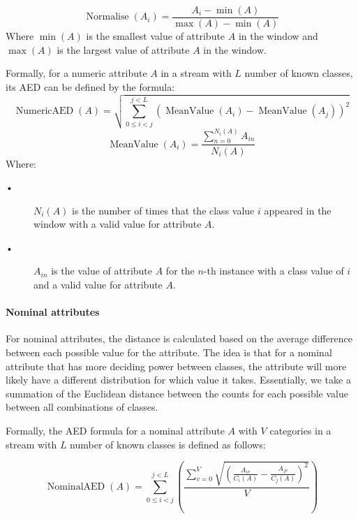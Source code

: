 \begin{equation}
\operatorname{Normalise}(A_i) = 
\frac{A_i - \operatorname{min}(A)}
     {\operatorname{max}(A) - \operatorname{min}(A)}
\end{equation}
Where $\operatorname{min}(A)$ is the smallest value of attribute $A$ in the window and $\operatorname{max}(A)$ is the largest value of attribute $A$ in the window.\bigskip

Formally, for a numeric attribute $A$ in a stream with $L$ number of known classes, its AED can be defined by the formula:\medskip
\begin{equation}
\operatorname{Numeric AED}(A) = 
\sqrt{
	\sum_{0\leq i<j}^{j<L}
	\left(
		\operatorname{MeanValue}(A_i)
		-
		\operatorname{MeanValue}(A_j)
	\right)^2
}
\end{equation}
\begin{equation}
\operatorname{MeanValue}(A_i) = 
\frac{\sum_{n=0}^{N_{i}(A)}A_{i n}}
	 {N_{i}(A)}
\end{equation}
Where: \begin{description}
\item[•]
$N_{i}(A)$ is the number of times that the class value $i$ appeared in the window with a valid value for attribute $A$.
\item[•]
$A_{i n}$ is the value of attribute $A$ for the $n$-th instance with a class value of $i$ and a valid value for attribute $A$.
\end{description}\medskip

\paragraph{Nominal attributes}
For nominal attributes, the distance is calculated based on the average difference between each possible value for the attribute. The idea is that for a nominal attribute that has more deciding power between classes, the attribute will more likely have a different distribution for which value it takes. Essentially, we take a summation of the Euclidean distance between the counts for each possible value between all combinations of classes.\medskip

Formally, the AED formula for a nominal attribute $A$ with $V$ categories in a stream with $L$ number of known classes is defined as follows:

\begin{equation}
\operatorname{Nominal AED}(A) = 
\sum_{0\leq i<j}^{j<L}
\left(
	\frac{
		\sum_{v=0}^{V}	
		\sqrt{
			\left(
				\frac{A_{i v}}
					 {C_{i}(A)}
			-
				\frac{A_{j v}}
					 {C_{j}(A)}
			\right)^2
		}
	}
	{V}
\right)
\end{equation}\\


